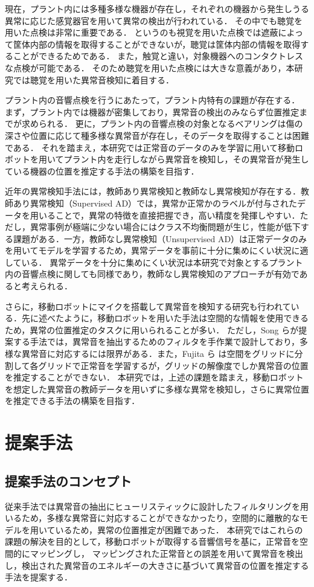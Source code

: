 \documentclass{/workdir/classes/summary}
\begin{document}
現在，プラント内には多種多様な機器が存在し，それぞれの機器から発生しうる異常に応じた感覚器官を用いて異常の検出が行われている．
その中でも聴覚を用いた点検は非常に重要である．
というのも視覚を用いた点検では遮蔽によって筐体内部の情報を取得することができないが，聴覚は筐体内部の情報を取得することができるためである．
また，触覚と違い，対象機器へのコンタクトレスな点検が可能である．
そのため聴覚を用いた点検には大きな意義があり，本研究では聴覚を用いた異常音検知に着目する．

プラント内の音響点検を行うにあたって，プラント内特有の課題が存在する．
まず，プラント内では機器が密集しており，異常音の検出のみならず位置推定までが求められる．
更に，プラント内の音響点検の対象となるベアリングは傷の深さや位置に応じて種多様な異常音が存在し，そのデータを取得することは困難である．
それを踏まえ，本研究では正常音のデータのみを学習に用いて移動ロボットを用いてプラント内を走行しながら異常音を検知し，その異常音が発生している機器の位置を推定する手法の構築を目指す．

近年の異常検知手法には，教師あり異常検知と教師なし異常検知が存在する．教師あり異常検知（Supervised AD）では，異常か正常かのラベルが付与されたデータを用いることで，異常の特徴を直接把握でき，高い精度を発揮しやすい．ただし，異常事例が極端に少ない場合にはクラス不均衡問題が生じ，性能が低下する課題がある．一方，教師なし異常検知（Unsupervised AD）は正常データのみを用いてモデルを学習するため，異常データを事前に十分に集めにくい状況に適している．
異常データを十分に集めにくい状況は本研究で対象とするプラント内の音響点検に関しても同様であり，教師なし異常検知のアプローチが有効であると考えられる．

さらに，移動ロボットにマイクを搭載して異常音を検知する研究も行われている．先に述べたように，移動ロボットを用いた手法は空間的な情報を使用できるため，異常の位置推定のタスクに用いられることが多い．
ただし，Song ら\cite{9023943}が提案する手法では，異常音を抽出するためのフィルタを手作業で設計しており，多様な異常音に対応するには限界がある．また，Fujita ら\cite{10202270} は空間をグリッドに分割して各グリッドで正常音を学習するが，グリッドの解像度でしか異常音の位置を推定することができない．
本研究では，上述の課題を踏まえ，移動ロボットを想定した異常音の教師データを用いずに多様な異常を検知し，さらに異常位置を推定できる手法の構築を目指す．
\section{提案手法}

\subsection{提案手法のコンセプト}
従来手法では異常音の抽出にヒューリスティックに設計したフィルタリングを用いるため，多様な異常音に対応することができなかったり，空間的に離散的なモデルを用いているため，異常の位置推定が困難であった．
本研究ではこれらの課題の解決を目的として，移動ロボットが取得する音響信号を基に，正常音を空間的にマッピングし，
マッピングされた正常音との誤差を用いて異常音を検出し，検出された異常音のエネルギーの大きさに基づいて異常音の位置を推定する手法を提案する．
\end{document}
